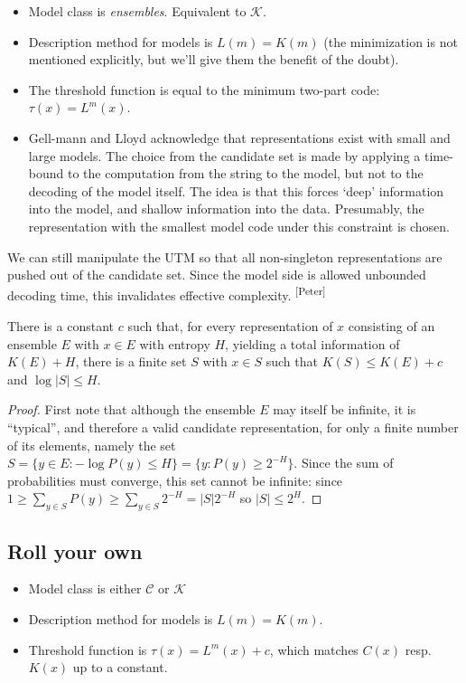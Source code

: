 \documentclass{style/llncs}
\newcommand{\C}{\mathcal C}
\newcommand{\K}{\mathcal K}
\newcommand{\pb}[1]{\textcolor{OliveGreen}{\small #1 \textsuperscript{[Peter]} }}
\begin{document}
\begin{itemize}
\item Model class is \emph{ensembles}. Equivalent to $\K$.
\item Description method for models is $L(m) = K(m)$ (the minimization is not mentioned explicitly, but we'll give them the benefit of the doubt).
\item The threshold function is equal to the minimum two-part code: $\tau(x)=L^m(x)$.
\item Gell-mann and Lloyd acknowledge that representations exist with small and large models. The choice from the candidate set is made by applying a time-bound to the computation from the string to the model, but not to the decoding of the model itself. The idea is that this forces `deep' information into the model, and shallow information into the data. Presumably, the representation with the smallest model code under this constraint is chosen.   
\end{itemize} 
\pb{We can still manipulate the UTM so that all non-singleton representations are pushed out of the candidate set. Since the model side is allowed unbounded decoding time, this invalidates effective complexity.}

\begin{theorem}
  There is a constant $c$ such that, for every representation of $x$
  consisting of an ensemble $E$ with $x\in E$ with entropy $H$,
  yielding a total information of $K(E)+H$, there is a finite set $S$
  with $x\in S$ such that $K(S)\le K(E)+c$ and $\log|S|\le H$.
\end{theorem}
\begin{proof}
  First note that although the ensemble $E$ may itself be infinite, it
  is ``typical'', and therefore a valid candidate representation, for
  only a finite number of its elements, namely the set $S=\{y\in E:-\log
  P(y)\le H\} = \{y:P(y)\ge 2^{-H}\}$. Since the sum of probabilities must
  converge, this set cannot be infinite: since $1\ge\sum_{y\in S} P(y)\ge
  \sum_{y\in S}2^{-H} = |S|2^{-H}$ so $|S|\le 2^H$.


\end{proof}



\subsection{Roll your own}


\begin{itemize}
\item Model class is either $\C$ or $\K$
\item Description method for models is $L(m)=K(m)$.
\item Threshold function is $\tau(x)=L^m(x)+c$, which matches $C(x)$
  resp. $K(x)$ up to a constant.
\end{itemize}
\end{document}

